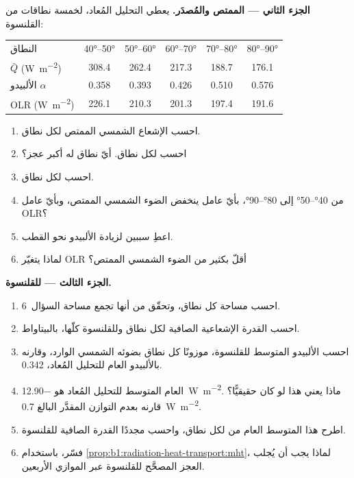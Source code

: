 \begin{problem}
\medskip
\noindent\textbf{الجزء الثاني --- الممتص والمُصدَر.} يعطي التحليل المُعاد، لخمسة نطاقات من القلنسوة:
\begin{center}
\small
\begin{tabular}{|l|ccccc|}
\hline
النطاق & \ang{40}--\ang{50} & \ang{50}--\ang{60} & \ang{60}--\ang{70} & \ang{70}--\ang{80} & \ang{80}--\ang{90} \\
$\bar Q$ (\unit{W.m^{-2}}) & 308.4 & 262.4 & 217.3 & 188.7 & 176.1 \\
الألبيدو $\alpha$ & 0.358 & 0.393 & 0.426 & 0.510 & 0.576 \\
OLR (\unit{W.m^{-2}}) & 226.1 & 210.3 & 201.3 & 197.4 & 191.6 \\
\hline
\end{tabular}
\end{center}
\begin{enumerate}[resume]
  \item احسب الإشعاع الشمسي الممتص لكل نطاق.
  \item احسب  لكل نطاق. أيّ نطاق له أكبر
        عجز؟
  \item احسب  لكل نطاق.
  \item من \ang{40}--\ang{50} إلى \ang{80}--\ang{90}، بأيّ عامل ينخفض الضوء الشمسي الممتص، وبأيّ عامل OLR؟
  \item اعطِ سببين لزيادة الألبيدو نحو القطب.
  \item لماذا يتغيّر OLR أقلّ بكثير من الضوء الشمسي الممتص؟
\end{enumerate}

\medskip
\noindent\textbf{الجزء الثالث ---  للقلنسوة.}
\begin{enumerate}[resume]
  \item احسب مساحة كل نطاق، وتحقّق من أنها تجمع مساحة السؤال~6.
  \item احسب القدرة الإشعاعية الصافية لكل نطاق وللقلنسوة كلّها، بالبيتاواط.
  \item احسب الألبيدو المتوسط للقلنسوة، موزونًا كل نطاق بضوئه الشمسي الوارد، وقارنه بالألبيدو العام للتحليل المُعاد، \num{0.342}.
  \item {} العام المتوسط للتحليل المُعاد هو \qty{-12.90}{W.m^{-2}}. ماذا يعني هذا لو كان حقيقيًّا؟ قارنه بعدم التوازن المقدَّر البالغ \qty{+0.7}{W.m^{-2}}.
  \item اطرح هذا المتوسط العام من  لكل نطاق، واحسب مجددًا القدرة الصافية للقلنسوة.
  \item فسّر، باستخدام \cref{prop:b1:radiation-heat-transport:mht}، لماذا يجب أن يُجلب العجز المصحَّح للقلنسوة عبر الموازي الأربعين.
\end{enumerate}


\end{problem}
